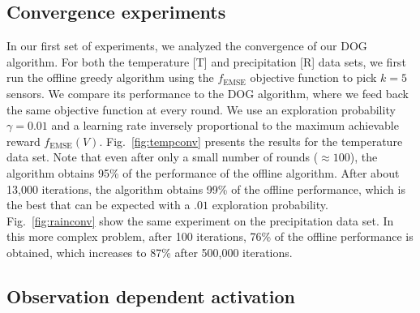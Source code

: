 \documentclass{sig-alternate-dan}
\numberwithin{equation}{section}
\newcommand{\algofont}[1]{\textsc{#1}}
\DeclareMathOperator{\EMSE}{EMSE}
\newcommand{\fEMSE}{f_{\EMSE}}
\newcommand{\dog}{\algofont{DOG}\xspace}
\newcommand{\sensors}{V}
\newcommand{\ignore}[1]{}
\newcommand{\figref}[1]{Fig.~\ref{#1}}
\begin{document}
\subsection{Convergence experiments}
In our first set of experiments, we analyzed the convergence of our
\dog algorithm.  For both the temperature [T] and precipitation [R]
data sets, we first run the offline greedy algorithm using the
$\fEMSE$ objective function to pick $k=5$ sensors.  We compare its
performance to the \dog algorithm, where we feed back the same
objective function at every round.  We use an exploration probability
$\gamma=0.01$ and a learning rate inversely proportional to the
maximum achievable reward $\fEMSE(\sensors)$.  \figref{fig:tempconv}
presents the results for the temperature data set.  Note that even
after only a small number of rounds ($\approx 100$), the algorithm
obtains 95\% of the performance of the offline algorithm.  After about
13,000 iterations, the algorithm obtains 99\% of the offline
performance, which is the best that can be expected with a $.01$
exploration probability. \figref{fig:rainconv} show the same
experiment on the precipitation data set.  In this more complex
problem, after 100 iterations, 76\% of the offline performance is
obtained, which increases to 87\% after 500,000 iterations.

\ignore{
  At each round, a different objective
function $f_{t}$ is selected, one for each contamination event.  We 
ran the offline greedy algorithm on the objective
$f_{\Sigma}(S)=\sum_{t}f_{t}(S)$, and then compared its result with
our \dog algorithm.  \figref{fig:waterconv} presents the results of
this experiment.  Note that in contrast to the results in
\figref{fig:tempconv} and \figref{fig:rainconv}, where we always feed
back the same objective function, in the varying objective function
case, there is more variance in the performance. However, 
despite these varying objectives, the average performance still
converges to the value of the offline solution that optimizes the
selection given knowledge of all objective functions.
}
%

%
\newcommand{\figwidth}{0.48\textwidth}
\newcommand{\figheightA}{0.22\textwidth}
\newcommand{\figheightB}{0.24\textwidth}

%

%
%
%
%
%

%
%
%
%
%
%


\subsection{Observation dependent activation}
\end{document}

